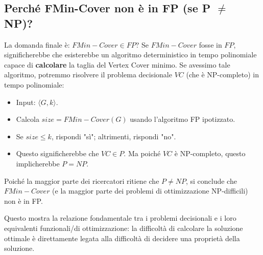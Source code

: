 \documentclass[a4paper]{article}
\begin{document}
\subsection{Perché FMin-Cover non è in FP (se P $\neq$ NP)?}
La domanda finale è: $FMin-Cover \in FP$?
Se $FMin-Cover$ fosse in $FP$, significherebbe che esisterebbe un algoritmo deterministico in tempo polinomiale capace di \textbf{calcolare} la taglia del Vertex Cover minimo.
Se avessimo tale algoritmo, potremmo risolvere il problema decisionale $VC$ (che è NP-completo) in tempo polinomiale:
\begin{itemize}
    \item Input: $\langle G, k \rangle$.
    \item Calcola $size = FMin-Cover(G)$ usando l'algoritmo FP ipotizzato.
    \item Se $size \le k$, rispondi "sì"; altrimenti, rispondi "no".
\item Questo significherebbe che $VC \in P$. Ma poiché $VC$ è NP-completo, questo implicherebbe $P=NP$.
\end{itemize}
Poiché la maggior parte dei ricercatori ritiene che $P \neq NP$, si conclude che $FMin-Cover$ (e la maggior parte dei problemi di ottimizzazione NP-difficili) non è in FP.

Questo mostra la relazione fondamentale tra i problemi decisionali e i loro equivalenti funzionali/di ottimizzazione: la difficoltà di calcolare la soluzione ottimale è direttamente legata alla difficoltà di decidere una proprietà della soluzione.
\end{document}
